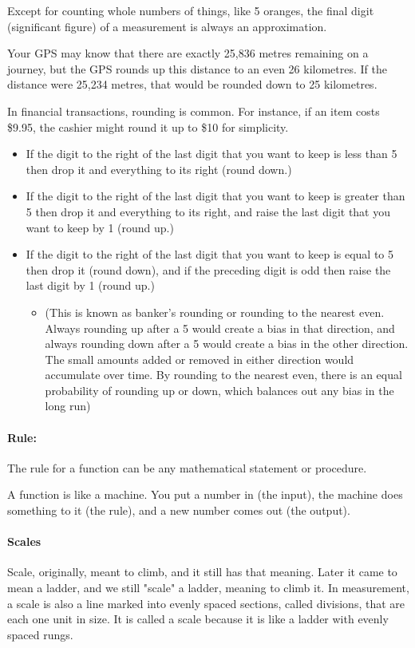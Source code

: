 \documentclass[12pt]{article}
\begin{document}
Except for counting whole numbers of things, like 5 oranges, the final digit (significant figure) of a measurement is always an approximation. 

Your GPS may know that there are exactly 25,836 metres remaining on a journey, but the GPS rounds up this distance to an even 26 kilometres. If the distance were 25,234 metres, that would be rounded down to 25 kilometres.

In financial transactions, rounding is common. For instance, if an item costs \$9.95, the cashier might round it up to \$10 for simplicity.

\begin{itemize}
\item If the digit to the right of the last digit that you want to keep is less than 5 then drop it and everything to its right (round down.)
\item If the digit to the right of the last digit that you want to keep is greater than 5 then drop it and everything to its right, and raise the last digit that you want to keep by 1 (round up.)
\item If the digit to the right of the last digit that you want to keep is equal to 5 then drop it (round down), and if the preceding digit is odd then raise the last digit by 1 (round up.)
\begin{itemize}
    \item [](This is known as banker's rounding or rounding to the nearest even. Always rounding up after a 5 would create a bias in that direction, and always rounding down after a 5 would create a bias in the other direction. The small amounts added or removed in either direction would accumulate over time. By rounding to the nearest even, there is an equal probability of rounding up or down, which balances out any bias in the long run)
\end{itemize}
\end{itemize}

\paragraph{Rule:} The rule for a function can be any mathematical statement or procedure.

A function is like a machine. You put a number in (the input), the machine does something to it (the rule), and a new number comes out (the output).

\paragraph{Scales}
Scale, originally, meant to climb, and it still has that meaning. Later it came to mean a ladder, and we still "scale" a ladder, meaning to climb it. In measurement, a scale is also a line marked into evenly spaced sections, called divisions, that are each one unit in size. It is called a scale because it is like a ladder with evenly spaced rungs.
\end{document}

